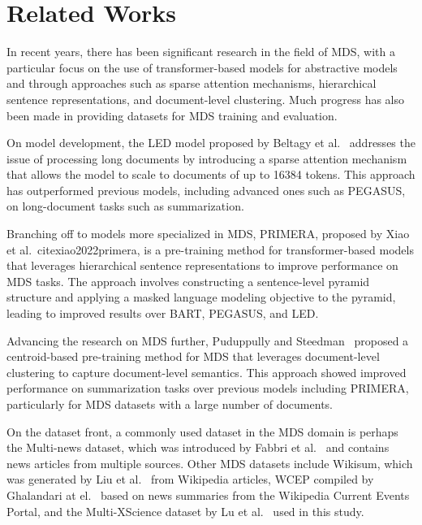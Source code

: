 \documentclass[12pt, twocolumn]{article}
\numberwithin{equation}{section}
\begin{document}
\section{Related Works}
\label{sec:relatedworks}

In recent years, there has been significant research in the field of MDS, with a particular focus on the use of transformer-based models for abstractive models and through approaches such as sparse attention mechanisms, hierarchical sentence representations, and document-level clustering. Much progress has also been made in providing datasets for MDS training and evaluation.

On model development, the LED model proposed by Beltagy et al.~\cite{beltagy2020longformer} addresses the issue of processing long documents by introducing a sparse attention mechanism that allows the model to scale to documents of up to 16384 tokens. This approach has outperformed previous models, including advanced ones such as PEGASUS, on long-document tasks such as summarization.

Branching off to models more specialized in MDS, PRIMERA, proposed by Xiao et al.~cite{xiao2022primera}, is a pre-training method for transformer-based models that leverages hierarchical sentence representations to improve performance on MDS tasks. The approach involves constructing a sentence-level pyramid structure and applying a masked language modeling objective to the pyramid, leading to improved results over BART, PEGASUS, and LED.

Advancing the research on MDS further, Puduppully and Steedman~\cite{puduppully2022multidocument} proposed a centroid-based pre-training method for MDS that leverages document-level clustering to capture document-level semantics. This approach showed improved performance on summarization tasks over previous models including PRIMERA, particularly for MDS datasets with a large number of documents.

On the dataset front, a commonly used dataset in the MDS domain is perhaps the Multi-news dataset, which was introduced by Fabbri et al.~\cite{fabbri-etal-2019-multi} and contains news articles from multiple sources.  Other MDS datasets include Wikisum, which was generated by Liu et al.~\cite{liu2018generating} from Wikipedia articles, WCEP compiled by Ghalandari at el.~\cite{ghalandari2020largescale} based on news summaries from the Wikipedia Current Events Portal, and the Multi-XScience dataset by Lu et al.~\cite{lu-etal-2020-multi-xscience} used in this study.  
\end{document}
